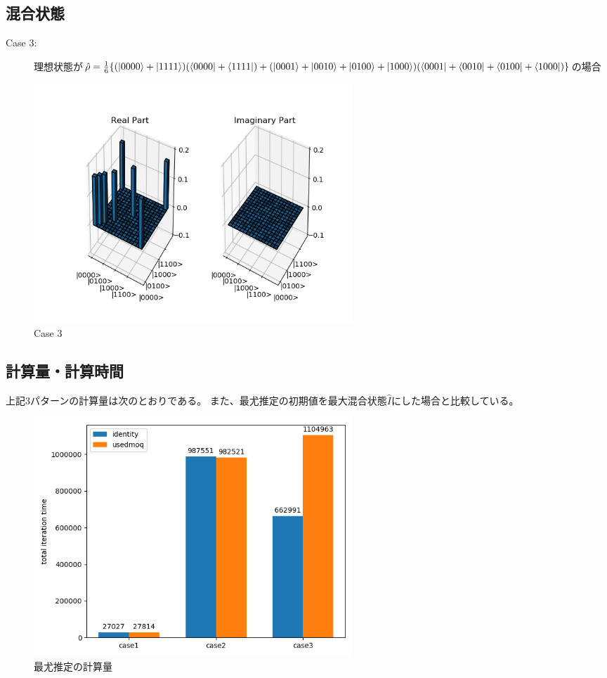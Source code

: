 \documentclass[11pt,a4j,notitlepage]{jreport}
\begin{document}
	\newpage
	\subsection*{混合状態}

	\begin{description}
		\item[Case 3:] 理想状態が$\hat{\rho} = \frac{1}{6} \{ (\ket{0000} + \ket{1111}) (\bra{0000} + \bra{1111}) + (\ket{0001} + \ket{0010} + \ket{0100} + \ket{1000}) (\bra{0001} + \bra{0010} + \bra{0100} + \bra{1000})\}$の場合 
	\end{description}
	
	\begin{figure}[htbp]
		\centering
			\includegraphics[clip,width=12.0cm]{./picture/mixed.png}
			\caption{Case 3}
	\end{figure}

	\newpage

	\subsection*{計算量・計算時間}

	上記3パターンの計算量は次のとおりである。
	また、最尤推定の初期値を最大混合状態$\hat{I}$にした場合と比較している。

	\begin{figure}[htbp]
		\centering
			\includegraphics[clip,width=12.0cm]{./picture/cg.png}
			\caption{最尤推定の計算量}
	\end{figure}
\end{document}

